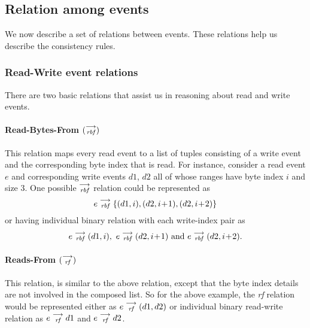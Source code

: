    \subsection{Relation among events}
    
        We now describe a set of relations between events. These relations help us describe the consistency rules.
        
        \subsubsection{Read-Write event relations}
        There are two basic relations that assist us in reasoning about read and write events.
        
            \paragraph{Read-Bytes-From $(\stackrel{\longrightarrow}{_\textit{rbf}})$}
        
            This relation maps every read event to a list of tuples consisting of a write event and the corresponding byte index that is read. For instance, consider a read event $e$ and corresponding write events $d1$, $d2$ all of whose ranges have byte index $i$ and size 3. One possible $\stackrel{\longrightarrow}{_\textit{rbf}}$ relation could be represented as  
                \[e\stackrel{\longrightarrow}{_{\textit{\textit{rbf}}}}\{(d1, i), (d2, i\!+\!1), (d2, i\!+\!2)\} \]
            or having individual binary relation with each write-index pair as 
                \begin{align*}
                    e\stackrel{\longrightarrow}{_{\textit{rbf}}}(d1, i),\ e\stackrel{\longrightarrow}{_{\textit{rbf}}}(d2, i\!+\!1)  \text{ and } e\stackrel{\longrightarrow}{_{\textit{rbf}}}(d2, i\!+\!2).
                \end{align*}
                
            \paragraph{Reads-From $(\stackrel{\longrightarrow}{_\textit{rf}})$}
            
            This relation, is similar to the above relation, except that the byte index details are not involved in the composed list. So for the above example, the \textit{rf} relation would be represented either as   
                $e\stackrel{\longrightarrow}{_{\textit{rf}}}(d1, d2)$
            or individual binary read-write relation as 
                $e\stackrel{\longrightarrow}{_{\textit{rf}}}d1$ and $e\stackrel{\longrightarrow}{_{\textit{rf}}}d2$.
        
